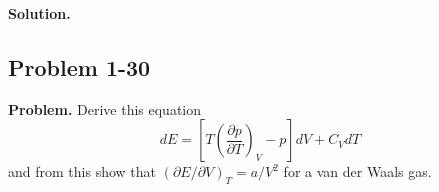 \documentclass[twocolumn, 10pt]{article}
\numberwithin{equation}{section}
\newenvironment{problem}
{\par\medskip\sffamily \color{problue}
  \textbf{Problem. }\ignorespaces}
{\medskip}
\newenvironment{solution}
{\par\medskip
  \textbf{Solution. }\ignorespaces}
{\medskip}
\begin{document}
\begin{solution}
\end{solution}

\subsection{Problem 1-30}

\begin{problem}
  Derive this equation
  \begin{equation}
  dE
  =
  \left[ T \left( \frac{ \partial p} {\partial T } \right)_V - p \right]
  dV + C_V dT
    \label{eq:dE_VT}
  \end{equation}
  and from this show that $(\partial E/\partial V)_T = a/V^2$
  for a van der Waals gas.
\end{problem}
\end{document}

